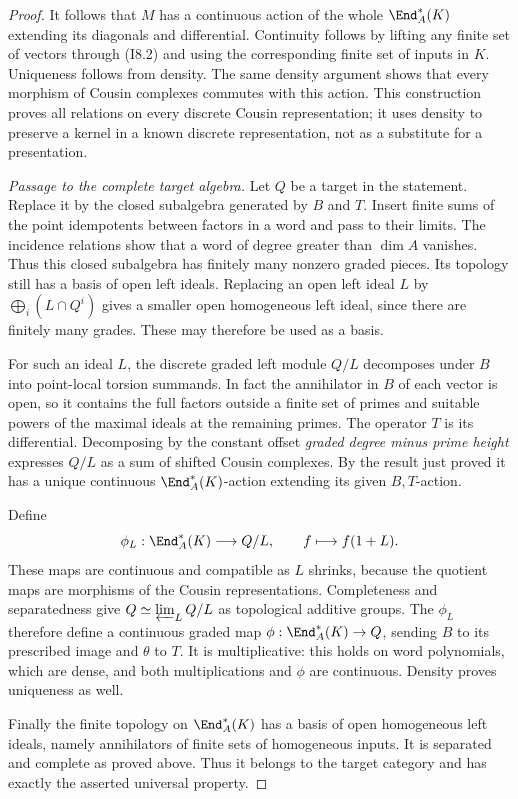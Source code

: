 \begin{proof}
It follows that $M$ has a continuous action of the whole
$\End_A^*(K)$ extending its diagonals and differential.
Continuity follows by lifting any finite set of vectors through
(I8.2) and using the corresponding finite set of inputs in $K$.
Uniqueness follows from density. The same density argument shows
that every morphism of Cousin complexes commutes with this action.
This construction proves all relations on every discrete Cousin
representation; it uses density to preserve a kernel in a known
discrete representation, not as a substitute for a presentation.

\emph{Passage to the complete target algebra.}
Let $Q$ be a target in the statement. Replace it by the closed
subalgebra generated by $B$ and $T$. Insert finite sums of the
point idempotents between factors in a word and pass to their
limits. The incidence relations show that a word of degree greater
than $\dim A$ vanishes. Thus this closed subalgebra has finitely
many nonzero graded pieces. Its topology still has a basis of open
left ideals. Replacing an open left ideal $L$ by
$\bigoplus_i(L\cap Q^i)$ gives a smaller open homogeneous left
ideal, since there are finitely many grades. These may therefore
be used as a basis.

For such an ideal $L$, the discrete graded left module $Q/L$
decomposes under $B$ into point-local torsion summands. In fact the
annihilator in $B$ of each vector is open, so it contains the full
factors outside a finite set of primes and suitable powers of the
maximal ideals at the remaining primes. The operator $T$ is its
differential. Decomposing by the constant offset
\emph{graded degree minus prime height} expresses $Q/L$ as a sum
of shifted Cousin complexes. By the result just proved it has a
unique continuous $\End_A^*(K)$-action extending its given
$B,T$-action.

Define
\[
 \phi_L:\End_A^*(K)\longrightarrow Q/L,
 \qquad f\longmapsto f(1+L).
\]
These maps are continuous and compatible as $L$ shrinks, because
the quotient maps are morphisms of the Cousin representations.
Completeness and separatedness give
$Q\simeq\varprojlim_L Q/L$ as topological additive groups.
The $\phi_L$ therefore define a continuous graded map
$\phi:\End_A^*(K)\to Q$, sending $B$ to its prescribed image
and $\theta$ to $T$. It is multiplicative: this holds on word
polynomials, which are dense, and both multiplications and $\phi$
are continuous. Density proves uniqueness as well.

Finally the finite topology on $\End_A^*(K)$ has a basis of open
homogeneous left ideals, namely annihilators of finite sets of
homogeneous inputs. It is separated and complete as proved above.
Thus it belongs to the target category and has exactly the asserted
universal property.
\end{proof}

